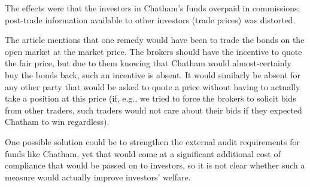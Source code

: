 \documentclass[a4paper]{article}
\newif\ifsolutions
\begin{document}
	The effects were that the investors in Chatham's funds overpaid in commissions; post-trade information available to other investors (trade prices) was distorted.
	
	The article mentions that one remedy would have been to trade the bonds on the open market at the market price. The brokers should have the incentive to quote the fair price, but due to them knowing that Chatham would almost-certainly buy the bonds back, such an incentive is absent. It would similarly be absent for any other party that would be asked to quote a price without having to actually take a position at this price (if, e.g., we tried to force the brokers to solicit bids from other traders, such traders would not care about their bids if they expected Chatham to win regardless).
	
	One possible solution could be to strengthen the external audit requirements for funds like Chatham, yet that would come at a significant additional cost of compliance that would be passed on to investors, so it is not clear whether such a measure would actually improve investors' welfare. 
\fi



{\ifsolutions \else	
	
\fi}
\end{document}
